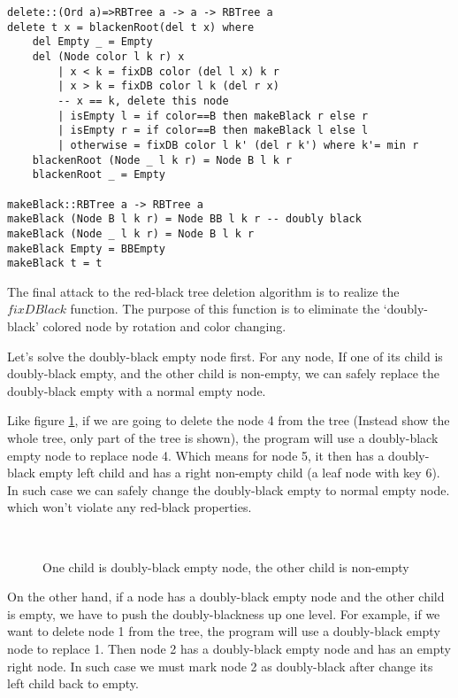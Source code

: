 \documentclass{article}
\begin{document}
\begin{lstlisting}
delete::(Ord a)=>RBTree a -> a -> RBTree a
delete t x = blackenRoot(del t x) where
    del Empty _ = Empty
    del (Node color l k r) x 
        | x < k = fixDB color (del l x) k r
        | x > k = fixDB color l k (del r x)
        -- x == k, delete this node
        | isEmpty l = if color==B then makeBlack r else r
        | isEmpty r = if color==B then makeBlack l else l
        | otherwise = fixDB color l k' (del r k') where k'= min r
    blackenRoot (Node _ l k r) = Node B l k r
    blackenRoot _ = Empty

makeBlack::RBTree a -> RBTree a
makeBlack (Node B l k r) = Node BB l k r -- doubly black
makeBlack (Node _ l k r) = Node B l k r
makeBlack Empty = BBEmpty
makeBlack t = t
\end{lstlisting}

The final attack to the red-black tree deletion algorithm is to
realize the $fixDBlack$ function. The purpose of this function
is to eliminate the `doubly-black' colored node by rotation and
color changing.

Let's solve the doubly-black empty node first. For any node, 
If one of its child is doubly-black empty, and the other child is 
non-empty, we can safely replace the doubly-black empty with a 
normal empty node. 

Like figure \ref{fig:db-fix-1-nil}, if we
are going to delete the node 4 from the tree (Instead show the whole tree,
only part of the tree is shown), the program will use a doubly-black empty node
to replace node 4. Which means for node 5, it then has a doubly-black empty left child
and has a right non-empty child (a leaf node with key 6). In such case we 
can safely change the doubly-black empty to normal empty node. 
which won't violate any red-black properties.

\begin{figure}[htbp]
   \centering
    \\
   \caption{One child is doubly-black empty node, the other child is non-empty} \label{fig:db-fix-1-nil}
\end{figure}

On the other hand, if a node has a doubly-black empty node and the other child is
empty, we have to push the doubly-blackness up one level. For example, if we want
to delete node 1 from the tree, the program will use a doubly-black empty node 
to replace 1. Then node 2 has a doubly-black empty node and has an empty right
node. In such case we must mark node 2 as doubly-black after change its
left child back to empty.
\end{document}
